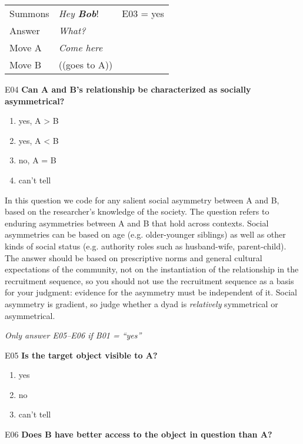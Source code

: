 \documentclass[output=paper]{langsci/langscibook}
\begin{document}
\begin{description}
\begin{tabular}{l l l}
Summons & \textit{Hey \textbf{Bob}}! & E03 = yes   \\
Answer & \textit{What?}  & \\
Move A  & \textit{Come here} & \\
Move B &  ((goes to A)) & \\
\end{tabular}

\item E04  \textbf{Can A and B’s relationship be characterized as socially asymmetrical?}

\begin{enumerate}
\item {yes, A} > {B}
\item {yes, A < B}
\item {no, A = B}
\item {can’t tell}
\end{enumerate}

In this question we code for any salient social asymmetry between A and B, based on the researcher’s knowledge of the society. The question refers to enduring asymmetries between A and B that hold across contexts. Social asymmetries can be based on age (e.g. older-younger siblings) as well as other kinds of social status (e.g. authority roles such as husband-wife, parent-child). The answer should be based on prescriptive norms and general cultural expectations of the community, not on the instantiation of the relationship in the recruitment sequence, so you should not use the recruitment sequence as a basis for your judgment: evidence for the asymmetry must be independent of it. Social asymmetry is gradient, so judge whether a dyad is \textit{relatively} symmetrical or asymmetrical.

\item
\textit{Only answer E05--E06 if B01 = “yes”}

\item
E05  \textbf{Is the target object visible to A?}

\begin{enumerate}
\item{yes}
\item {no}
\item {can’t tell}
\end{enumerate}

\item
E06  \textbf{Does B have better access to the object in question than A?}


\end{description}
\end{document}
